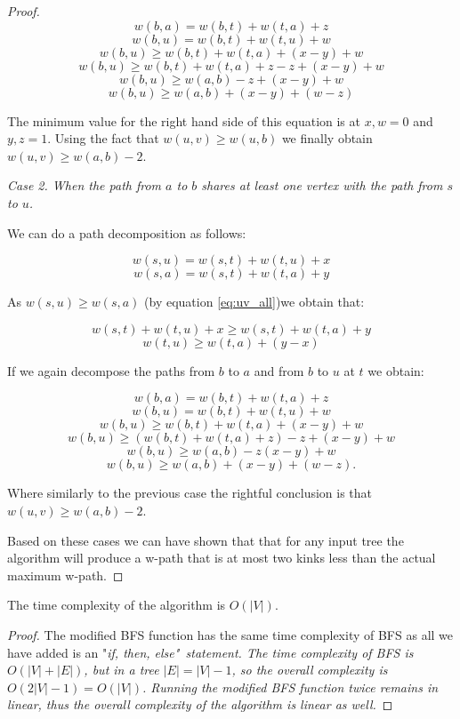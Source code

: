 \begin{proof}
$$ w(b, a) = w(b, t) + w(t, a) + z  $$
$$ w(b, u) = w(b, t) + w(t, u) + w  $$
$$ w(b, u) \ge w(b, t) + w(t, a) + (x - y) + w $$
$$ w(b, u) \ge w(b, t) + w(t, a) + z - z + (x - y) + w $$
$$ w(b, u) \ge w(a, b) - z + (x - y) + w $$
$$ w(b, u) \ge w(a, b) + (x - y) + (w - z) $$

The minimum value for the right hand side of this equation is at $x, w = 0$ and $y, z = 1$. Using the fact that $w(u, v) \ge w(u, b)$ we finally obtain $ w(u, v) \ge w(a, b) - 2 $.


{\em Case 2. When the path from $a$ to $b$ shares at least one vertex with the path from $s$ to $u$.}


We can do a path decomposition as follows:

$$ w(s, u) = w(s, t) + w(t, u) + x $$
$$ w(s, a) = w(s, t) + w(t, a) + y $$

As $w(s, u) \ge w(s, a)$ (by equation \ref{eq:uv_all})we obtain that:

$$ w(s, t) + w(t, u) + x  \ge w(s, t) + w(t, a) + y $$
$$ w(t, u) \ge w(t, a) + (y - x) $$

If we again decompose the paths from $b$ to $a$ and from $b$ to $u$ at $t$ we obtain:

$$ w(b, a) = w(b, t) + w(t, a) + z  $$
$$ w(b, u) = w(b, t) + w(t, u) + w  $$
$$ w(b, u) \ge w(b, t) + w(t, a) + (x - y) + w $$
$$ w(b, u) \ge (w(b, t) + w(t, a) + z) - z + (x - y) + w $$
$$ w(b, u) \ge w(a, b) - z (x - y) + w $$
$$ w(b, u) \ge w(a, b) + (x - y) + (w - z). $$

Where similarly to the previous case the rightful conclusion is that $ w(u, v) \ge w(a, b) - 2 $.

Based on these cases we can have shown that that for any input tree the algorithm will produce a w-path that is at most two kinks less than the actual maximum w-path.


\end{proof}

\begin{lem} The time complexity of the algorithm is $O(|V|)$. \end{lem}

\begin{proof}
    The modified BFS function has the same time complexity of BFS as all we have added is an "\em if, then, else\em"~statement. The time complexity of BFS is $O(|V| + |E|)$, but in a tree $|E| = |V| - 1$, so the overall complexity is $O(2|V| - 1) = O(|V|)$. 
    Running the modified BFS function twice remains in linear, thus the overall complexity of the algorithm is linear as well.
\end{proof}

